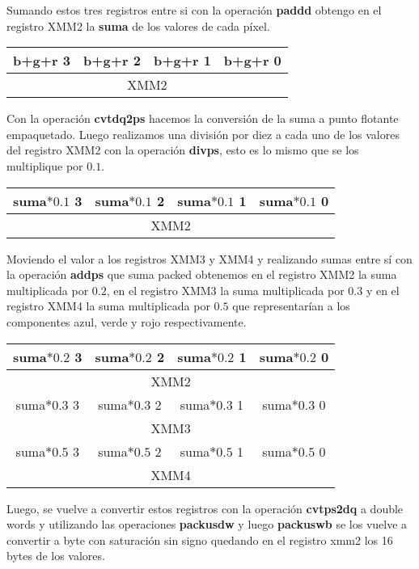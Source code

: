 Sumando estos tres registros entre si con la operación \textbf{paddd} obtengo en el registro XMM2 la \textbf{suma} de los valores de cada píxel.

\begin{table}[!h]
	\centering
	\begin{tabular}{| c | c | c | c |}
		\hline
		b+g+r 3 & b+g+r 2 & b+g+r 1 & b+g+r 0 \\ \hline
		\multicolumn{4}{c}{XMM2}
	\end{tabular}
\end{table}


Con la operación \textbf{cvtdq2ps} hacemos la conversión de la suma a punto flotante empaquetado. Luego realizamos una división por diez a cada uno de los valores del registro XMM2 con la operación \textbf{divps}, esto es lo mismo que se los multiplique por $0.1$.

\begin{table}[!h]
	\centering
	\begin{tabular}{| c | c | c | c |}
		\hline
		suma$*0.1$ 3 & suma$*0.1$ 2 & suma$*0.1$ 1 & suma$*0.1$ 0 \\ \hline
		\multicolumn{4}{c}{XMM2}
	\end{tabular}
\end{table}

Moviendo el valor a los registros XMM3 y XMM4 y realizando sumas entre sí con la operación \textbf{addps} que suma packed obtenemos en el registro XMM2 la suma multiplicada por $0.2$, en el registro XMM3 la suma multiplicada por $0.3$ y en el registro XMM4 la suma multiplicada por $0.5$ que representarían a los componentes azul, verde y rojo respectivamente.

\begin{table}[!h]
	\centering
	\begin{tabular}{| c | c | c | c |}
		\hline
		suma$*0.2$ 3 & suma$*0.2$ 2 & suma$*0.2$ 1 & suma$*0.2$ 0  \\ \hline
		\multicolumn{4}{c}{XMM2} \\
		\hline
		suma$*0.3$ 3 & suma$*0.3$ 2 & suma$*0.3$ 1 & suma$*0.3$ 0  \\ \hline
		\multicolumn{4}{c}{XMM3} \\
		\hline
		suma$*0.5$ 3 & suma$*0.5$ 2 & suma$*0.5$ 1 & suma$*0.5$ 0  \\ \hline
		\multicolumn{4}{c}{XMM4}
	\end{tabular}
\end{table}


Luego, se vuelve a convertir estos registros con la operación \textbf{cvtps2dq} a double words y utilizando las operaciones \textbf{packusdw} y luego \textbf{packuswb} se los vuelve a convertir a byte con saturación sin signo quedando en el registro xmm2 los 16 bytes de los valores.


